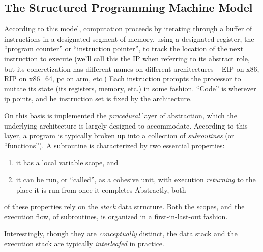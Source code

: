 \documentclass[12pt,glossary]{dalthesis}
\begin{document}
\subsection{The Structured Programming Machine Model}
\label{sec:org2acf3d4}
\label{org5800169}



According to this model, computation proceeds by iterating through a buffer of
instructions in a designated segment of memory, using a designated register, the
``program counter'' or ``instruction pointer'', to track the location of the next
instruction to execute (we'll call this the IP when referring to its abstract
role, but its concretization has different names on different architectures --
EIP on x86, RIP on x86\_64, \gls{pc} on \gls{arm}, etc.) Each instruction prompts the
processor to mutate its state (its registers, memory, etc.) in some fashion.
``Code'' is wherever \gls{ip} points, and he instruction set is fixed by the
architecture.

On this basis is implemented the \emph{procedural} layer of abstraction, which the
underlying architecture is largely designed to accommodate. According to this
layer, a program is typically broken up into a collection of \emph{subroutines} (or
``functions''). A subroutine is characterized by two essential properties:
\begin{enumerate}
\item it has a local variable scope, and
\item it can be run, or ``called'', as a cohesive unit, with execution
\emph{returning} to the place it is run from once it completes Abstractly, both
\end{enumerate}
of these properties rely on the \emph{stack} data structure. Both the scopes, and the
execution flow, of subroutines, is organized in a first-in-last-out fashion.

Interestingly, though they are \emph{conceptually} distinct, the data stack and the
execution stack are typically \emph{interleafed} in practice.
\end{document}
